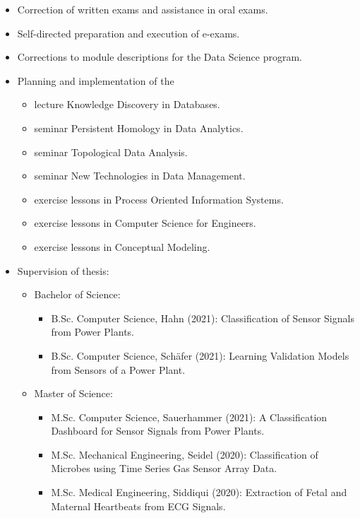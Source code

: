 \documentclass[a4paper, 11pt]{article}
\begin{document}
	\begin{itemize}
		\item Correction of written exams and assistance in oral exams.

		\item Self-directed preparation and execution of e-exams.

		\item Corrections to module descriptions for the Data Science program.

		\item Planning and implementation of the
			\begin{itemize}
				\item lecture \glqq Knowledge Discovery in Databases\grqq.

				\item seminar \glqq Persistent Homology in Data Analytics\grqq.

				\item seminar \glqq Topological Data Analysis\grqq.

				\item seminar \glqq New Technologies in Data Management\grqq.

				\item exercise lessons in \glqq Process Oriented Information Systems\grqq.

				\item exercise lessons in \glqq Computer Science for Engineers\grqq.

				\item exercise lessons in \glqq Conceptual Modeling\grqq.
			\end{itemize}

		\item Supervision of thesis:
			\begin{itemize}[noitemsep, leftmargin=*]
				\item Bachelor of Science:
					\begin{itemize}
						\item B.Sc. Computer Science, Hahn (2021): Classification of Sensor
							Signals from Power Plants.

						\item B.Sc. Computer Science, Schäfer (2021): Learning Validation
							Models from Sensors of a Power Plant.
					\end{itemize}

				\item Master of Science:
					\begin{itemize}
						\item M.Sc. Computer Science, Sauerhammer (2021): A Classification
							Dashboard for Sensor Signals from Power Plants.

						\item M.Sc. Mechanical Engineering, Seidel (2020): Classification of
							Microbes using Time Series Gas Sensor Array Data.

						\item M.Sc. Medical Engineering, Siddiqui (2020): Extraction of
							Fetal and Maternal Heartbeats from ECG Signals.
					\end{itemize}
			\end{itemize}
	\end{itemize}
\end{document}
